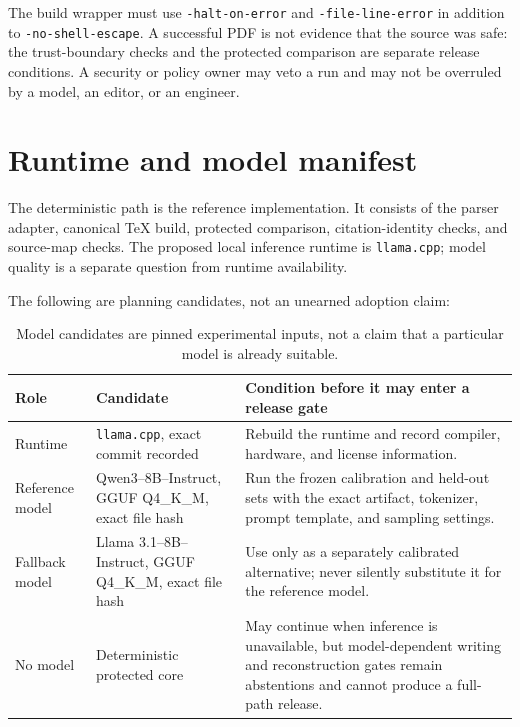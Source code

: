 The build wrapper must use \texttt{-halt-on-error} and \texttt{-file-line-error}
in addition to \texttt{-no-shell-escape}. A successful PDF is not evidence that
the source was safe: the trust-boundary checks and the protected comparison are
separate release conditions. A security or policy owner may veto a run and may
not be overruled by a model, an editor, or an engineer.

\section{Runtime and model manifest}
\label{sec:contract-runtime}

The deterministic path is the reference implementation. It consists of the
parser adapter, canonical TeX build, protected comparison, citation-identity
checks, and source-map checks. The proposed local inference runtime is
\texttt{llama.cpp}; model quality is a separate question from runtime
availability.

The following are planning candidates, not an unearned adoption claim:

\begin{table}[H]
\centering
\small
\begin{tabularx}{\textwidth}{@{}p{}p{}L@{}}
\toprule
Role & Candidate & Condition before it may enter a release gate \\
\midrule
Runtime & \texttt{llama.cpp}, exact commit recorded & Rebuild the runtime and
record compiler, hardware, and license information. \\
Reference model & Qwen3--8B--Instruct, GGUF Q4\_K\_M, exact file hash & Run
the frozen calibration and held-out sets with the exact artifact, tokenizer,
prompt template, and sampling settings. \\
Fallback model & Llama 3.1--8B--Instruct, GGUF Q4\_K\_M, exact file hash &
Use only as a separately calibrated alternative; never silently substitute it
for the reference model. \\
No model & Deterministic protected core & May continue when inference is
unavailable, but model-dependent writing and reconstruction gates remain
abstentions and cannot produce a full-path release. \\
\bottomrule
\end{tabularx}
\caption{Model candidates are pinned experimental inputs, not a claim that a
particular model is already suitable.}
\label{tab:contract-models}
\end{table}

